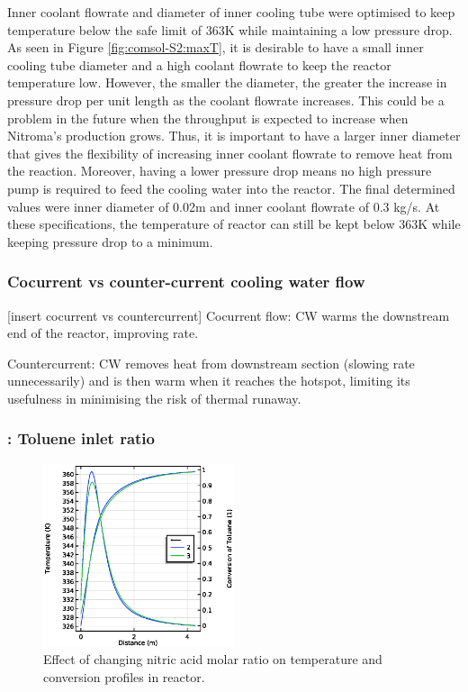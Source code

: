 Inner coolant flowrate and diameter of inner cooling tube were optimised to keep temperature below the safe limit of 363K while maintaining a low pressure drop. As seen in Figure \ref{fig:comsol-S2:maxT}, it is desirable to have a small inner cooling tube diameter and a high coolant flowrate to keep the reactor temperature low. However, the smaller the diameter, the greater the increase in pressure drop per unit length as the coolant flowrate increases. This could be a problem in the future when the throughput is expected to increase when Nitroma's production grows. Thus, it is important to have a larger inner diameter that gives the flexibility of increasing inner coolant flowrate to remove heat from the reaction. Moreover, having a lower pressure drop means no high pressure pump is required to feed the cooling water into the reactor. The final determined values were inner diameter of 0.02m and inner coolant flowrate of 0.3 kg/s. At these specifications, the temperature of reactor can still be kept below 363K while keeping pressure drop to a minimum.

\subsubsection{Cocurrent vs counter-current cooling water flow}
[insert cocurrent vs countercurrent]
Cocurrent flow: CW warms the downstream end of the reactor, improving rate.

Countercurrent: CW removes heat from downstream section (slowing rate unnecessarily) and is then warm when it reaches the hotspot, limiting its usefulness in minimising the risk of thermal runaway.

\subsubsection{ : Toluene inlet ratio}

\begin{figure}
    \vspace{-\intextsep}
    \includegraphics[width=0.5\textwidth]{figures/S3-T-X.eps}
    \caption{Effect of changing nitric acid molar ratio on temperature and conversion profiles in reactor.}
    \label{fig:comsol-S3-T-X}
\end{figure}

